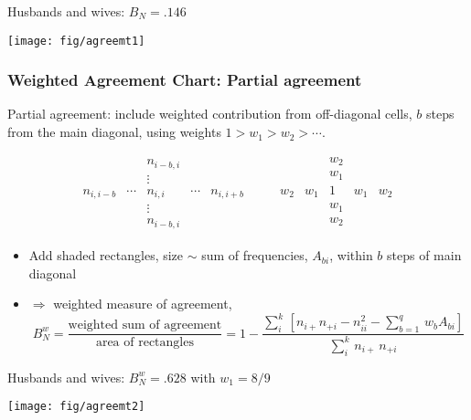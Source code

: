\begin{frame}
Husbands and wives: $B_N = .146$
 \begin{center}
 \texttt{[image: fig/agreemt1]}
 \end{center}
  
\end{frame}

\begin{frame}
  \frametitle{Weighted Agreement Chart: Partial agreement}
 Partial agreement:
include  weighted contribution from off-diagonal cells, \(b\)
steps from the main diagonal, using weights $ 1 > w_1 > w_2 > \cdots$.

  \[
 \left.
 \begin{array}{ccccc}
   &  & n_{i-b,i} &  & \\
    &  & \vdots    &  & \\
    n_{i, i-b} & \cdots & n_{i, i} & \cdots & n_{i, i+b} \\
    &  & \vdots    &  & \\
   &  & n_{i-b,i} &  &
 \end{array}
  \right.
  \qquad
 \left.
 \begin{array}{ccccc}
   &  & w_2 &  & \\
   &  & w_1 &  & \\
 w_2 & w_1 & 1 & w_1 & w_2 \\
   &  & w_1 &  & \\
   &  & w_2 &  & \\
 \end{array}
  \right.
  \]

  \begin{itemize}
	\item Add shaded rectangles, size $\sim$ sum of frequencies, \(A_{bi}\), within $b$ steps of main diagonal
	\item $\Rightarrow$ weighted measure of agreement,
  \[
  B_N^w  =
  \frac{ \mbox{weighted sum  of agreement}}
  { \mbox{area of rectangles} }  =
  1 - \frac{ \sum_i^k \,
  [ n_{i+} n_{+i} - n_{ii}^2  -
  \sum_{b=1}^q \,  w_b  A_{bi} ] }
  { \sum_i^k \,  n_{i+} \,  n_{+i} }
  \]
  \end{itemize}
\end{frame}

\begin{frame}
Husbands and wives: $B_N^w = .628$ with $w_1 = 8/9$
 \begin{center}
 \texttt{[image: fig/agreemt2]}
 \end{center}
\end{frame}

